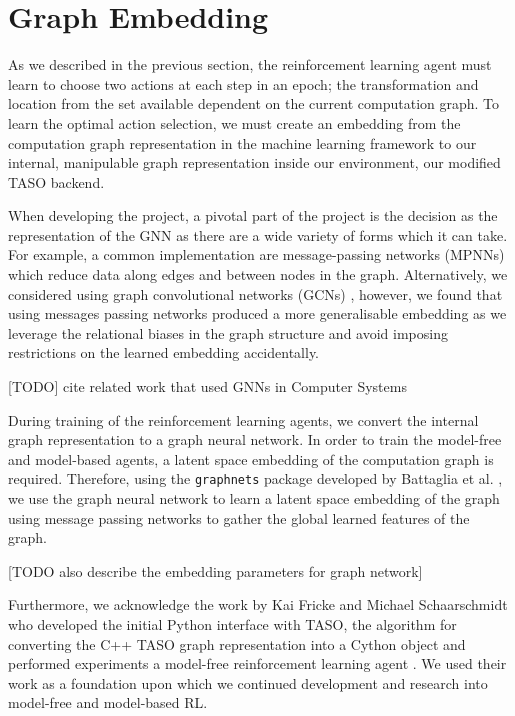 \section{Graph Embedding}
\label{sec:design:subsec:embed}
As we described in the previous section, the reinforcement learning agent must learn to choose two actions at each step in an epoch; the transformation and location from the set available dependent on the current computation graph. To learn the optimal action selection, we must create an embedding from the computation graph representation in the machine learning framework to our internal, manipulable graph representation inside our environment, our modified TASO backend.

When developing the project, a pivotal part of the project is the decision as the representation of the GNN as there are a wide variety of forms which it can take. For example, a common implementation are message-passing networks (MPNNs) \cite{gilmer2017neural} which reduce data along edges and between nodes in the graph. Alternatively, we considered using graph convolutional networks (GCNs) \cite{kipf2016semi}, however, we found that using messages passing networks produced a more generalisable embedding as we leverage the relational biases in the graph structure and avoid imposing restrictions on the learned embedding accidentally.

[TODO] cite related work that used GNNs in Computer Systems

During training of the reinforcement learning agents, we convert the internal graph representation to a graph neural network. In order to train the model-free and model-based agents, a latent space embedding of the computation graph is required. Therefore, using the \texttt{graph\textunderscore nets} package developed by Battaglia et al. \cite{battaglia2018relational}, we use the graph neural network to learn a latent space embedding of the graph using message passing networks to gather the global learned features of the graph.

[TODO also describe the embedding parameters for graph network]

Furthermore, we acknowledge the work by Kai Fricke and Michael Schaarschmidt who developed the initial Python interface with TASO, the algorithm for converting the C++ TASO graph representation into a Cython object and performed experiments a model-free reinforcement learning agent \cite{xflowrl2019}. We used their work as a foundation upon which we continued development and research into model-free and model-based RL.
